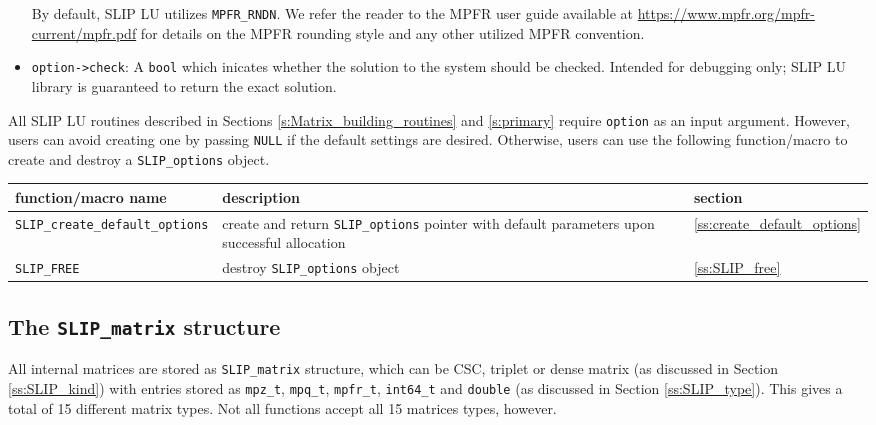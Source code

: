 \documentclass[12pt]{article}
\theoremstyle{definition}
\begin{document}
\begin{itemize}
\noindent By default, SLIP LU utilizes \verb|MPFR_RNDN|. We refer the reader to
the MPFR user guide available at
\url{https://www.mpfr.org/mpfr-current/mpfr.pdf} for details on the MPFR
rounding style and any other utilized MPFR convention.

\item
\verb|option->check|: A \verb|bool| which inicates whether the solution to the
system should be checked. Intended for debugging only; SLIP LU library is
guaranteed to return the exact solution.

\end{itemize}

All SLIP LU routines described in Sections \ref{s:Matrix_building_routines} and
\ref{s:primary} require \verb|option| as an input argument. However, users can
avoid creating one by passing \verb|NULL| if the default settings are desired.
Otherwise, users can use the following function/macro to create and destroy a
\verb|SLIP_options| object.

\begin{center}
\begin{tabular}{lp{2.5in}l}
\hline
function/macro name & description & section \\
\hline
\verb|SLIP_create_default_options|
    & create and return \verb|SLIP_options| pointer
      with default parameters upon successful allocation
    & \ref{ss:create_default_options} \\
\hline
\verb|SLIP_FREE|
    & destroy \verb|SLIP_options| object
    & \ref{ss:SLIP_free} \\
\hline
\end{tabular}
\end{center}

\cprotect\subsection{The \verb|SLIP_matrix| structure}
\label{ss:SLIP_matrix}

All internal matrices are stored as \verb|SLIP_matrix| structure, which can
be CSC, triplet or dense matrix (as discussed in Section \ref{ss:SLIP_kind})
with entries stored as \verb|mpz_t|, \verb|mpq_t|, \verb|mpfr_t|,
\verb|int64_t| and \verb|double| (as discussed in Section \ref{ss:SLIP_type}).
This gives a total of 15 different matrix types.  Not all functions accept
all 15 matrices types, however.
\end{document}
